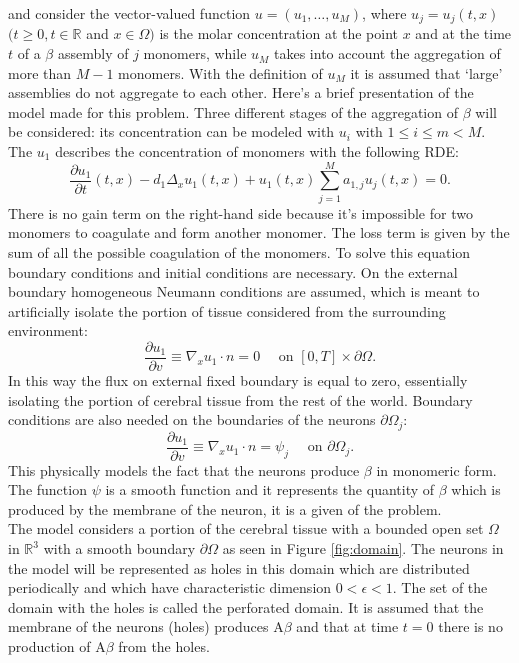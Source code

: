\noindent and consider the vector-valued function $u=(u_1,\dots, u_M)$, where $u_j=u_j(t,x)$ $(t\geq 0, t\in \mathbb{R}$ and $x\in \Omega)$ is the molar concentration at the point $x$ and at the time $t$ of a \(\beta\) assembly of $j$ monomers, while $u_M$ takes into account the aggregation of more than $M-1$ monomers. With the definition of $u_M$ it is assumed that `large' assemblies do not aggregate to each other.
Here's a brief presentation of the model made for this problem. Three different stages of the aggregation of \(\beta\) will be considered: its concentration can be modeled with $u_{i}$ with $1\leq i \leq m < M$.
The $u_{1}$ describes the concentration of monomers with the following RDE: 
$$
\frac{\partial u_{1}}{\partial t}(t, x)-d_{1} \Delta_{x} u_{1}(t, x)+u_{1}(t, x) \sum_{j=1}^{M} a_{1, j} u_{j}(t, x)=0.
$$
There is no gain term on the right-hand side because it's impossible for two monomers to coagulate and form another monomer. The loss term is given by the sum of all the possible coagulation of the monomers. 
To solve this equation boundary conditions and initial conditions are necessary.
On the external boundary homogeneous Neumann conditions are assumed, which is meant to artificially isolate the portion of tissue considered from the surrounding environment:
$$
\frac{\partial u_1}{\partial v} \equiv \nabla_{x} u_1\cdot n=0 \quad \text { on }[0, T] \times \partial \Omega.$$
In this way the flux on external fixed boundary is equal to zero, essentially isolating the portion of cerebral tissue from the rest of the world.
Boundary conditions are also needed on the boundaries of the neurons $\partial\Omega_{j}$:
$$ 
\frac{\partial u_{1}}{\partial v} \equiv \nabla_{x} u_1 \cdot n= \psi_{j} \quad \text { on } \partial\Omega_{j}.
$$
This physically models the fact that the neurons produce \(\beta\) in monomeric form. The function $\psi$ is a smooth function and it represents the quantity of \(\beta\) which is produced by the membrane of the neuron, it is a given of the problem.\\
The model considers a portion of the cerebral tissue with a bounded open set $\Omega$ in $\mathbb{R}^{3}$ with a smooth boundary $\partial \Omega$ as seen in Figure \ref{fig:domain}. The neurons in the model will be represented as holes in this domain which are distributed periodically and which have characteristic dimension $0<\epsilon<1$. The set of the domain with the holes is called the perforated domain.
It is assumed that the membrane of the neurons (holes) produces $\mathrm{A} \beta$ and that at time $t=0$ there is no production of  $\mathrm{A} \beta$ from the holes.
